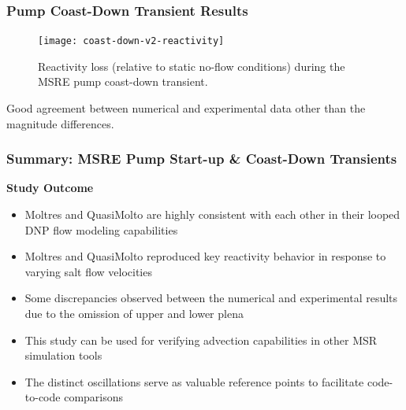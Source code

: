 \begin{frame}
  \frametitle{Pump Coast-Down Transient Results}
  \begin{figure}[t]
    \centering
    \texttt{[image: coast-down-v2-reactivity]}
    \caption{Reactivity loss (relative to static no-flow conditions) during the \gls{MSRE} pump
    coast-down transient.}
    \label{fig:start-up-reactivity}
  \end{figure}
  Good agreement between numerical and experimental data other than the magnitude differences.
\end{frame}

\begin{frame}
  \frametitle{Summary: MSRE Pump Start-up \& Coast-Down Transients}
  \begin{block}{\textbf{Study Outcome}}
    \begin{itemize}
      \item Moltres and QuasiMolto are highly consistent with each other in their looped DNP flow
        modeling capabilities
      \item Moltres and QuasiMolto reproduced key reactivity behavior in response to varying salt
        flow velocities
      \item Some discrepancies observed between the numerical and experimental results due to the
        omission of upper and lower plena
      \item This study can be used for verifying advection capabilities in other MSR simulation tools
      \item The distinct oscillations serve as valuable reference points to facilitate code-to-code
        comparisons
    \end{itemize}
  \end{block}
\end{frame}

